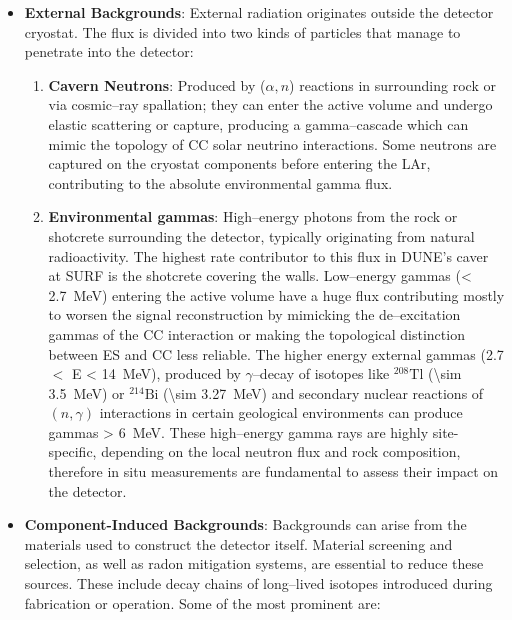 \begin{itemize}
  \item\textbf{External Backgrounds}: External radiation originates outside the detector cryostat. The flux is divided into two kinds of particles that manage to penetrate into the detector:

        \begin{enumerate}
          \item\textbf{Cavern Neutrons}: Produced by (\(\alpha,n\)) reactions in surrounding rock or via cosmic--ray spallation; they can enter the active volume and undergo elastic scattering or capture, producing a gamma--cascade which can mimic the topology of \ac{CC} solar neutrino interactions. Some neutrons are captured on the cryostat components before entering the \ac{LAr}, contributing to the absolute environmental gamma flux.
          \item\textbf{Environmental gammas}: High--energy photons from the rock or shotcrete surrounding the detector, typically originating from natural radioactivity. The highest rate contributor to this flux in \ac{DUNE}'s caver at SURF is the shotcrete covering the walls. Low--energy gammas (\SI{< 2.7}{\mega\electronvolt}) entering the active volume have a huge flux contributing mostly to worsen the signal reconstruction by mimicking the de--excitation gammas of the \ac{CC} interaction or making the topological distinction between \ac{ES} and \ac{CC} less reliable. The higher energy external gammas (\num{2.7} $<$ E \SI{< 14}{\mega\electronvolt}), produced by \(\gamma\)--decay of isotopes like \(^{208}\text{Tl}\) (\SI{\sim 3.5}{\mega\electronvolt}) or \(^{214}\text{Bi}\) (\SI{\sim 3.27}{\mega\electronvolt}) and secondary nuclear reactions of $(n,\gamma)$ interactions in certain geological environments can produce gammas \SI{> 6}{\mega\electronvolt}. These high--energy gamma rays are highly site-specific, depending on the local neutron flux and rock composition, therefore in situ measurements are fundamental to assess their impact on the detector.
        \end{enumerate}

  \item \textbf{Component-Induced Backgrounds}: Backgrounds can arise from the materials used to construct the detector itself. Material screening and selection, as well as radon mitigation systems, are essential to reduce these sources. These include decay chains of long--lived isotopes introduced during fabrication or operation. Some of the most prominent are:


\end{itemize}

